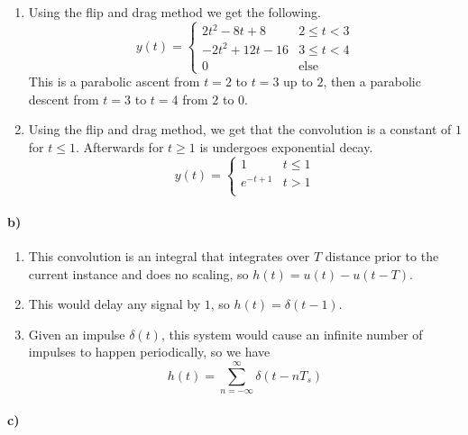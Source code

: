 \documentclass[12pt]{article}
\begin{document}
\begin{enumerate}
    \item Using the flip and drag method we get the following.
    \[y(t)=
        \begin{cases}
            2t^2-8t+8 & 2\leq t < 3\\
            -2t^2+12t-16 & 3\leq t < 4\\
            0 & \text{else}
        \end{cases}
    \]
    This is a parabolic ascent from \(t=2\) to \(t=3\) up to \(2\), then a parabolic descent from \(t=3\) to \(t=4\) from \(2\) to \(0\).
    \item Using the flip and drag method, we get that the convolution is a constant of \(1\) for \(t\leq 1\). Afterwards for \(t\geq 1\) is undergoes
    exponential decay.
    \[y(t)=
        \begin{cases}
            1 & t\leq 1\\
            e^{-t+1} & t>1\\
        \end{cases}
    \]
\end{enumerate}

\paragraph{b)}

\begin{enumerate}
    \item This convolution is an integral that integrates over \(T\) distance prior to the current instance and does no scaling, so \(h(t)=u(t)-u(t-T)\).
    \item This would delay any signal by \(1\), so \(h(t)=\delta(t-1)\).
    \item Given an impulse \(\delta(t)\), this system would cause an infinite number of impulses to happen periodically, so we have
    \[h(t)=\sum_{n=-\infty}^\infty \delta(t-nT_s)\]
\end{enumerate}

\paragraph{c)}
\end{document}
